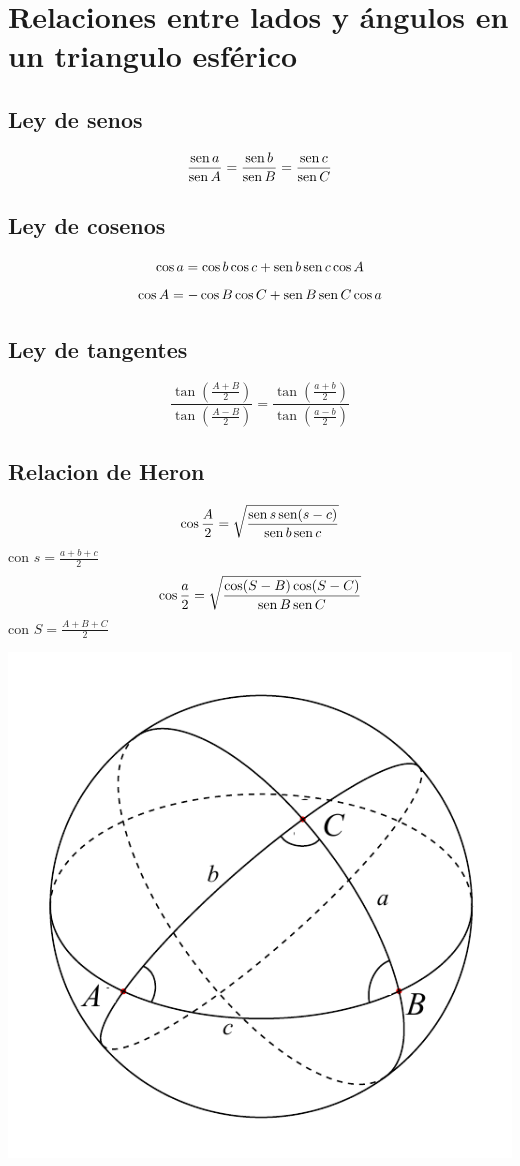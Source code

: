 \section*{Relaciones entre lados y ángulos en un triangulo esférico}
\begin{minipage}[c]{0.5\textwidth}
\subsection*{Ley de senos}
$$\frac{\operatorname{sen} a}{\operatorname{sen} A}=\frac{\operatorname{sen} b}{\operatorname{sen} B}=\frac{\operatorname{sen} c}{\operatorname{sen} C}$$
\subsection*{Ley de cosenos}
$$\cos a = \cos b \cos c + \operatorname{sen} b \operatorname{sen} c \cos A $$
$$\cos A = -\cos B \cos C + \operatorname{sen} B \operatorname{sen} C \cos a $$
\subsection*{Ley de tangentes}
$$\frac{\tan \left( \frac{A+B}{2} \right)}{\tan \left( \frac{A-B}{2} \right)}=\frac{\tan \left( \frac{a+b}{2} \right)}{\tan \left( \frac{a-b}{2} \right)}$$

\subsection*{Relacion de Heron}
$$\cos \frac{A}{2} = \sqrt{\frac{\operatorname{sen} s \operatorname{sen}(s-c)}{\operatorname{sen} b \operatorname{sen} c}}$$
con $s=\frac{a+b+c}{2}$
$$\cos \frac{a}{2} = \sqrt{\frac{\cos (S-B) \cos (S-C)}{\operatorname{sen} B \operatorname{sen} C}}$$
con $S=\frac{A+B+C}{2}$
\end{minipage}
\begin{minipage}[c]{0.5\textwidth}
\includegraphics[scale=1]{figuras/esptriangle}
\end{minipage}